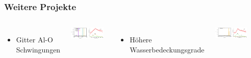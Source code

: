 \documentclass[hyperref={pdfpagelabels=false}]{beamer}
\begin{document}
\begin{frame}
 \frametitle{Weitere Projekte}
 \begin{columns}
 \begin{itemize}
  \item Gitter Al-O Schwingungen%
 \end{itemize}
 \includegraphics[width=0.9\textwidth]{figures/clean-surf-spectra.png}
 \begin{itemize}
 \item Höhere Wasserbedeckungsgrade
\end{itemize}
 \includegraphics[width=0.9\textwidth]{figures/fully-cov-spectra.png}
 \begin{center}

\end{center}
\end{columns}
\end{frame}
\end{document}

